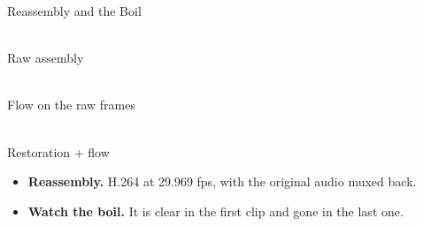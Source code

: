 \begin{frame}{Reassembly and the Boil}
    \vspace*{-0.1cm}
    \begin{center}
        \begin{minipage}[b]{4.2cm}
            \centering
            \\[0.08cm]
            {\scriptsize Raw assembly}
        \end{minipage}\hfill
        \begin{minipage}[b]{4.2cm}
            \centering
            \\[0.08cm]
            {\scriptsize Flow on the raw frames}
        \end{minipage}\hfill
        \begin{minipage}[b]{4.2cm}
            \centering
            \\[0.08cm]
            {\scriptsize Restoration + flow}
        \end{minipage}
    \end{center}

    \vspace{0.1cm}
    \small
    \begin{itemize}
        \item \textbf{Reassembly.} H.264 at 29.969 fps, with the original audio muxed back.
        \item \textbf{Watch the boil.} It is clear in the first clip and gone in the last one.
    \end{itemize}
\end{frame}

